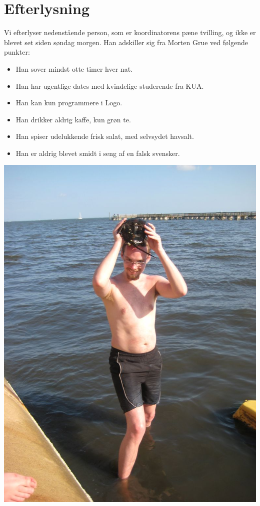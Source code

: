 \begin{minipage}[b]{0.95\linewidth}
\begin{minipage}[t]{0.47\textwidth}
\section*{Efterlysning}

Vi efterlyser nedenstående person, som er koordinatorens pæne tvilling, og ikke er blevet set siden søndag morgen. Han adskiller sig fra Morten Grue ved følgende punkter:
\begin{itemize}
\item Han sover mindst otte timer hver nat.
\item Han har ugentlige dates med kvindelige studerende fra KUA.
\item Han kan kun programmere i Logo.
\item Han drikker aldrig kaffe, kun grøn te.
\item Han spiser udelukkende frisk salat, med selvsydet havsalt.
\item Han er aldrig blevet smidt i seng af en falsk svensker.
\end{itemize}

\includegraphics[width=\linewidth]{sexygrue.jpg}

\end{minipage}
\end{minipage}
